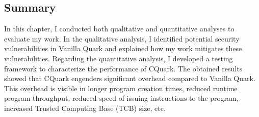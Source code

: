 \subsection{Summary}
In this chapter, I conducted both qualitative and quantitative analyses to evaluate my work. In the qualitative analysis, I identified potential security vulnerabilities in Vanilla Quark and explained how my work mitigates these vulnerabilities. Regarding the quantitative analysis, 
I developed a testing framework to characterize the performance of CQuark. The obtained results showed that CQuark engenders significant overhead compared to Vanilla Quark. 
This overhead is visible in longer program creation times, reduced runtime program throughput, reduced speed of issuing instructions to the program, increased Trusted Computing Base (TCB) size, etc.










\cleardoublepage

